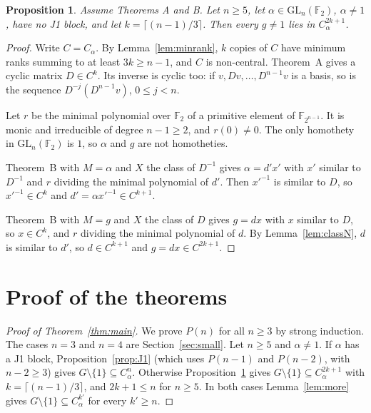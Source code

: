 \documentclass[11pt]{amsart}
\newtheorem{proposition}[theorem]{Proposition}
\theoremstyle{definition}
\theoremstyle{remark}
\newcommand{\F}{\mathbb{F}_2}
\newcommand{\GL}{\mathrm{GL}}
\begin{document}
\begin{proposition}\label{prop:cyclic}
Assume Theorems A and B. Let $n\ge5$, let $\alpha\in\GL_n(\F)$, $\alpha\ne1$, have no J1 block, and
let $k=\lceil(n-1)/3\rceil$. Then every $g\ne1$ lies in $C_\alpha^{2k+1}$.
\end{proposition}

\begin{proof}
Write $C=C_\alpha$. By Lemma~\ref{lem:minrank}, $k$ copies of $C$ have minimum ranks summing to at
least $3k\ge n-1$, and $C$ is non-central. Theorem~A gives a cyclic matrix $D\in C^k$. Its inverse
is cyclic too: if $v,Dv,\dots,D^{n-1}v$ is a basis, so is the sequence $D^{-j}(D^{n-1}v)$,
$0\le j<n$.

Let $r$ be the minimal polynomial over $\F$ of a primitive element of $\mathbb{F}_{2^{n-1}}$. It is
monic and irreducible of degree $n-1\ge2$, and $r(0)\ne0$. The only homothety in $\GL_n(\F)$ is
$1$, so $\alpha$ and $g$ are not homotheties.

Theorem~B with $M=\alpha$ and $X$ the class of $D^{-1}$ gives $\alpha=d'x'$ with $x'$ similar to
$D^{-1}$ and $r$ dividing the minimal polynomial of $d'$. Then $x'^{-1}$ is similar to $D$, so
$x'^{-1}\in C^k$ and $d'=\alpha x'^{-1}\in C^{k+1}$.

Theorem~B with $M=g$ and $X$ the class of $D$ gives $g=dx$ with $x$ similar to $D$, so $x\in
C^k$, and $r$ dividing the minimal polynomial of $d$. By Lemma~\ref{lem:classN}, $d$ is similar to
$d'$, so $d\in C^{k+1}$ and $g=dx\in C^{2k+1}$.
\end{proof}

\section{Proof of the theorems}\label{sec:proof}

\begin{proof}[Proof of Theorem~\ref{thm:main}]
We prove $P(n)$ for all $n\ge3$ by strong induction. The cases $n=3$ and $n=4$ are
Section~\ref{sec:small}. Let $n\ge5$ and $\alpha\ne1$. If $\alpha$ has a J1 block,
Proposition~\ref{prop:J1} (which uses $P(n-1)$ and $P(n-2)$, with $n-2\ge3$) gives
$G\setminus\{1\}\subseteq C_\alpha^n$. Otherwise Proposition~\ref{prop:cyclic} gives
$G\setminus\{1\}\subseteq C_\alpha^{2k+1}$ with $k=\lceil(n-1)/3\rceil$, and $2k+1\le n$ for
$n\ge5$. In both cases Lemma~\ref{lem:more} gives $G\setminus\{1\}\subseteq C_\alpha^{k'}$ for
every $k'\ge n$.
\end{proof}
\end{document}

